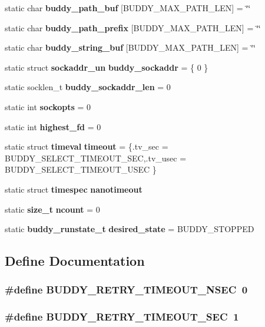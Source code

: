 \begin{DoxyCompactItemize}
$$static char {\bf buddy\_\-path\_\-buf} [BUDDY\_\-MAX\_\-PATH\_\-LEN] = \char`\"{}\char`\"{}
\item 
static char {\bf buddy\_\-path\_\-prefix} [BUDDY\_\-MAX\_\-PATH\_\-LEN] = \char`\"{}\char`\"{}
\item 
static char {\bf buddy\_\-string\_\-buf} [BUDDY\_\-MAX\_\-PATH\_\-LEN] = \char`\"{}\char`\"{}
\item 
static struct {\bf sockaddr\_\-un} {\bf buddy\_\-sockaddr} = \{ 0 \}
\item 
static socklen\_\-t {\bf buddy\_\-sockaddr\_\-len} = 0
\item 
static int {\bf sockopts} = 0
\item 
static int {\bf highest\_\-fd} = 0
\item 
static struct {\bf timeval} {\bf timeout} = \{.tv\_\-sec = BUDDY\_\-SELECT\_\-TIMEOUT\_\-SEC,.tv\_\-usec = BUDDY\_\-SELECT\_\-TIMEOUT\_\-USEC \}
\item 
static struct {\bf timespec} {\bf nanotimeout}
\item 
static {\bf size\_\-t} {\bf ncount} = 0
\item 
static {\bf buddy\_\-runstate\_\-t} {\bf desired\_\-state} = BUDDY\_\-STOPPED
\end{DoxyCompactItemize}


\subsection{Define Documentation}
\subsubsection[{BUDDY\_\-RETRY\_\-TIMEOUT\_\-NSEC}]{\setlength{\rightskip}{0pt plus 5cm}\#define BUDDY\_\-RETRY\_\-TIMEOUT\_\-NSEC~0}\label{buddy_8c_a374adc6ab83d41ad69c660812a5e3854}
\subsubsection[{BUDDY\_\-RETRY\_\-TIMEOUT\_\-SEC}]{\setlength{\rightskip}{0pt plus 5cm}\#define BUDDY\_\-RETRY\_\-TIMEOUT\_\-SEC~1}\label{buddy_8c_a597f1456de2807772248521856a6ca1c}
